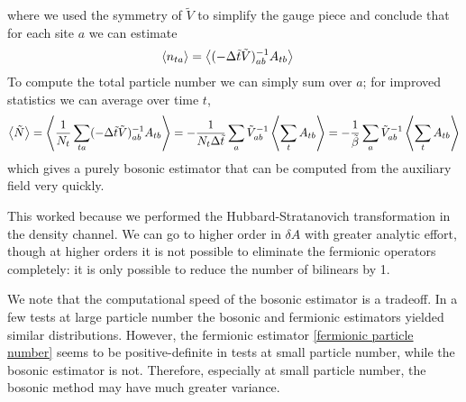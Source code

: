 where we used the symmetry of $\tilde{V}$ to simplify the gauge piece and conclude that for each site $a$ we can estimate
\begin{align}
	\left\langle n_{ta} \right\rangle &= \left\langle (-\Delta\tilde{t}\tilde{V})_{ab}^{-1} A_{tb} \right\rangle
\end{align}
To compute the total particle number we can simply sum over $a$; for improved statistics we can average over time $t$,
\begin{align}
	\left\langle \tilde{N} \right\rangle
	= \left\langle \frac{1}{N_t}\sum_{ta}(-\Delta\tilde{t}\tilde{V})_{ab}^{-1} A_{tb} \right\rangle
    = - \frac{1}{N_t \Delta \tilde{t}} \sum_a \tilde{V}_{ab}^{-1} \left\langle  \sum_t A_{tb} \right\rangle
    = - \frac{1}{\tilde{\beta}} \sum_a \tilde{V}_{ab}^{-1} \left\langle  \sum_t A_{tb} \right\rangle
	\label{eq:bosonic particle number}
\end{align}
which gives a purely bosonic estimator that can be computed from the auxiliary field very quickly.

This worked because we performed the Hubbard-Stratanovich transformation in the density channel.
We can go to higher order in $\delta A$ with greater analytic effort, though at higher orders it is not possible to eliminate the fermionic operators completely: it is only possible to reduce the number of bilinears by 1.

We note that the computational speed of the bosonic estimator is a tradeoff.
In a few tests at large particle number the bosonic and fermionic estimators yielded similar distributions.
However, the fermionic estimator \eqref{fermionic particle number} seems to be positive-definite in tests at small particle number, while the bosonic estimator is not.
Therefore, especially at small particle number, the bosonic method may have much greater variance.


